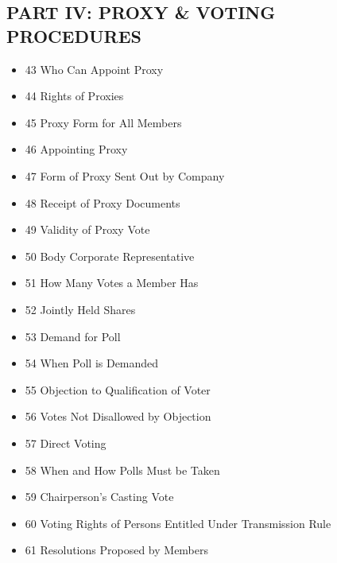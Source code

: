 \subsection*{PART IV: PROXY \& VOTING PROCEDURES}
\begin{itemize}[leftmargin=1em]
    \item 43 Who Can Appoint Proxy
    \item 44 Rights of Proxies
    \item 45 Proxy Form for All Members
    \item 46 Appointing Proxy
    \item 47 Form of Proxy Sent Out by Company
    \item 48 Receipt of Proxy Documents
    \item 49 Validity of Proxy Vote
    \item 50 Body Corporate Representative
    \item 51 How Many Votes a Member Has
    \item 52 Jointly Held Shares
    \item 53 Demand for Poll
    \item 54 When Poll is Demanded
    \item 55 Objection to Qualification of Voter
    \item 56 Votes Not Disallowed by Objection
    \item 57 Direct Voting
    \item 58 When and How Polls Must be Taken
    \item 59 Chairperson's Casting Vote
    \item 60 Voting Rights of Persons Entitled Under Transmission Rule
    \item 61 Resolutions Proposed by Members
\end{itemize}


